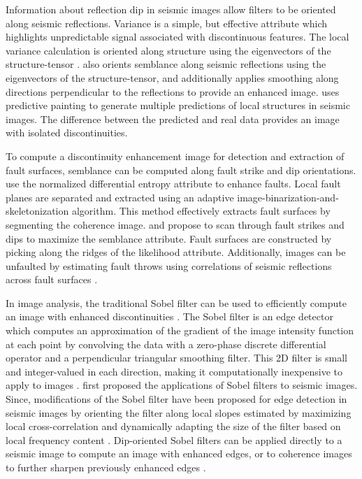 Information about reflection dip in seismic images allow filters to be oriented along seismic reflections.
Variance is a simple, but effective attribute which highlights unpredictable signal associated with discontinuous features.
The local variance calculation is oriented along structure using the eigenvectors of the structure-tensor \cite[]{randen01}.
\cite{hale09} also orients semblance along seismic reflections using the eigenvectors of the structure-tensor, and additionally applies smoothing along directions perpendicular to the reflections to provide an enhanced image.
\cite{karimi} uses predictive painting \cite[]{fomel10} to generate multiple predictions of local structures in seismic images.
The difference between the predicted and real data provides an image with isolated discontinuities.

To compute a discontinuity enhancement image for detection and extraction of fault surfaces, semblance can be computed along fault strike and dip orientations.
\cite{cohen} use the normalized differential entropy attribute to enhance faults.
Local fault planes are separated and extracted using an adaptive image-binarization-and-skeletonization algorithm.
This method effectively extracts fault surfaces by segmenting the coherence image.
\cite{hale13} and \cite{wu16a} propose to scan through fault strikes and dips to maximize the semblance attribute.
Fault surfaces are constructed by picking along the ridges of the likelihood attribute.
Additionally, images can be unfaulted by estimating fault throws using correlations of seismic reflections across fault surfaces \cite[]{wu16b}.

In image analysis, the traditional Sobel filter can be used to efficiently compute an image with enhanced discontinuities \cite[]{sobel}.
The Sobel filter is an edge detector which computes an approximation of the gradient of the image intensity function at each point by convolving the data with a zero-phase discrete differential operator and a perpendicular triangular smoothing filter.
This 2D filter is small and integer-valued in each direction, making it computationally inexpensive to apply to images \cite[]{ogorman}.
\cite{luo} first proposed the applications of Sobel filters to seismic images.
Since, modifications of the Sobel filter have been proposed for edge detection in seismic images by orienting the filter along local slopes estimated by maximizing local cross-correlation and dynamically adapting the size of the filter based on local frequency content \cite[]{aqrawi11a,aqrawi11b,aqrawi14}.
Dip-oriented Sobel filters can be applied directly to a seismic image to compute an image with enhanced edges, or to coherence images to further sharpen previously enhanced edges \cite[]{chopra14}.

